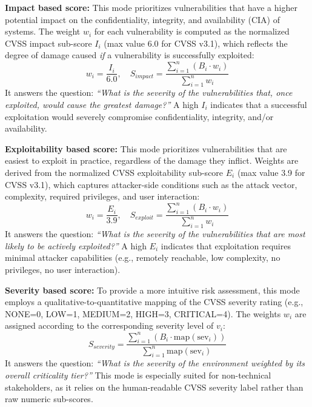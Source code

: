 \documentclass[conference]{IEEEtran}
\begin{document}
\textbf{Impact based score:}
This mode prioritizes vulnerabilities that have a higher potential impact on the confidentiality, integrity, and availability (CIA) of systems. The weight $w_i$ for each vulnerability is computed as the normalized CVSS impact sub-score $I_i$ (max value 6.0 for CVSS v3.1), which reflects the degree of damage caused \textit{if} a vulnerability is successfully exploited:
\begin{equation}
w_i = \frac{I_i}{6.0}, \quad S_{impact} = \frac{\sum_{i=1}^{n} (B_i \cdot w_i)}{\sum_{i=1}^{n} w_i}
\end{equation}
It answers the question: \textit{``What is the severity of the vulnerabilities that, once exploited, would cause the greatest damage?''} A high $I_i$ indicates that a successful exploitation would severely compromise confidentiality, integrity, and/or availability.

\textbf{Exploitability based score:}
This mode prioritizes vulnerabilities that are easiest to exploit in practice, regardless of the damage they inflict. Weights are derived from the normalized CVSS exploitability sub-score $E_i$ (max value 3.9 for CVSS v3.1), which captures attacker-side conditions such as the attack vector, complexity, required privileges, and user interaction:
\begin{equation}
w_i = \frac{E_i}{3.9}, \quad S_{exploit} = \frac{\sum_{i=1}^{n} (B_i \cdot w_i)}{\sum_{i=1}^{n} w_i}
\end{equation}
It answers the question: \textit{``What is the severity of the vulnerabilities that are most likely to be actively exploited?''} A high $E_i$ indicates that exploitation requires minimal attacker capabilities (e.g., remotely reachable, low complexity, no privileges, no user interaction).

\textbf{Severity based score:}
To provide a more intuitive risk assessment, this mode employs a qualitative-to-quantitative mapping of the CVSS severity rating (e.g., NONE=0, LOW=1, MEDIUM=2, HIGH=3, CRITICAL=4). The weights $w_i$ are assigned according to the corresponding severity level of $v_i$:
\begin{equation}
S_{severity} = \frac{\sum_{i=1}^{n} (B_i \cdot \text{map}(\text{sev}_i))}{\sum_{i=1}^{n} \text{map}(\text{sev}_i)}
\end{equation}
It answers the question: \textit{``What is the severity of the environment weighted by its overall criticality tier?''} This mode is especially suited for non-technical stakeholders, as it relies on the human-readable CVSS severity label rather than raw numeric sub-scores.
\end{document}

